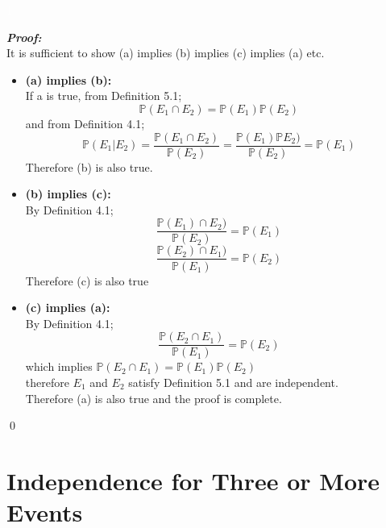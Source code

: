 \documentclass{report}
\newenvironment{cframedp}[1][Black]
  {\begin{tcolorbox}[colframe=#1,colback=white]}
  {\end{tcolorbox}}
\begin{document}
\textcolor{White}{1}\\
\begin{cframedp}
\textit{\textbf{Proof:}}\\
It is sufficient to show (a) implies (b) implies (c) implies (a) etc.
\begin{itemize}
    \item \textbf{(a) implies (b):}\\
    If a is true, from Definition 5.1;
    \begin{equation}
        \mathbb{P}(E_1 \cap E_2) = \mathbb{P}(E_1)\mathbb{P}(E_2)
    \end{equation}
    and from Definition 4.1;
    \begin{equation}
        \mathbb{P}(E_1|E_2) = \frac{\mathbb{P}(E_1 \cap E_2)}{\mathbb{P}(E_2)}
        = \frac{\mathbb{P}(E_1)\mathbb{P}E_2)}{\mathbb{P}(E_2)}
        =\mathbb{P}(E_1)
    \end{equation}
    Therefore (b) is also true.\\
    \item \textbf{(b) implies (c):}\\
    By Definition 4.1;
    \begin{equation}
        \frac{\mathbb{P}(E_1) \cap E_2)}{\mathbb{P}(E_2)} = \mathbb{P}(E_1)
    \end{equation}
    \begin{equation}
        \frac{\mathbb{P}(E_2) \cap E_1)}{\mathbb{P}(E_1)} = \mathbb{P}(E_2)
    \end{equation}
    Therefore (c) is also true\\
    \item \textbf{(c) implies (a):}\\
    By Definition 4.1;
    \begin{equation}
        \frac{\mathbb{P}(E_2 \cap E_1)}{\mathbb{P}(E_1)} = \mathbb{P}(E_2)
    \end{equation}
    which implies $\mathbb{P}(E_2 \cap E_1) = \mathbb{P}(E_1)\mathbb{P}(E_2)$\\
    therefore $E_1$ and $E_2$ satisfy Definition 5.1 and are independent.\\
    Therefore (a) is also true and the proof is complete.
\end{itemize}   
\qed
\end{cframedp}

\section{Independence for Three or More Events}
\end{document}
